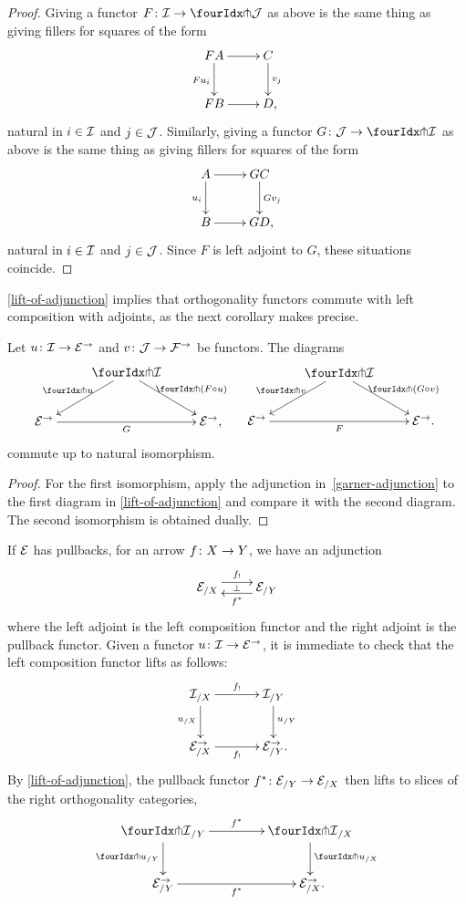\documentclass[reqno,10pt,a4paper,oneside,draft]{amsart}
\begin{document}
\begin{proof}
Giving a functor $F \co \cal{I} \to \liftl{\cal{J}}$ as above is the same thing as giving fillers for squares of the form
\[
\xymatrix{
  F A
  \ar[d]_{F u_i}
  \ar[r]
&
  C \ar[d]^{v_j}
\\
  F B
  \ar[r]
&
  D
\rlap{,}}
\]
natural in $i \in \cal{I}$ and $j \in \cal{J}$.
Similarly, giving a functor $G \co \cal{J} \to \liftl{\cal{I}}$ as above is the same thing as giving fillers for squares of the form
\[
\xymatrix{
  A
  \ar[d]_{u_i}
  \ar[r]
&
  G C
  \ar[d]^{G v_j}
\\
  B
  \ar[r]
&
  G D
\rlap{,}}
\]
natural in $i \in \cal{I}$ and $j \in \cal{J}$.
Since $F$ is left adjoint to $G$, these situations coincide.
\end{proof}

\cref{lift-of-adjunction} implies that orthogonality functors commute with left composition with adjoints, as the next corollary makes precise.

\begin{corollary} \label{pitchfork-adjunction}
Let $u \co \cal{I} \to \catE^\to$ and $v \co \cal{J} \to \cal{F}^\to$ be functors.
The diagrams
\begin{align*}
\xycenter{
&
  \liftr{\cal{I}}
  \ar[dr]^-{\liftr{(F \cc u)}}
  \ar[dl]_-{\liftr{u}}
&\\
  \catE^\to
  \ar[rr]_-{G}
&&
  \catE^\to
\rlap{,}}
&&
\xycenter{
&
  \liftl{\cal{I}}
  \ar[dl]_-{\liftl{v}}
  \ar[dr]^-{\liftl{(G \cc v)}}
&\\
  \catE^\to
  \ar[rr]_-{F}
&&
  \catE^\to
\rlap{.}}
\end{align*}
commute up to natural isomorphism.
\end{corollary}

\begin{proof}
For the first isomorphism, apply the adjunction in~\eqref{garner-adjunction} to the first diagram in \cref{lift-of-adjunction} and compare it with the second diagram.
The second isomorphism is obtained dually.
\end{proof}

\begin{example} \label{exa:composition-pullback-lift}
If $\cal{E}$ has pullbacks, for an arrow $f \co X \to Y$, we have an adjunction
\[
\xymatrix{
  \catE_{/X}
  \ar@<1ex>[r]^{f_!}
  \ar@{}[r]|{\bot}
&
  \catE_{/Y}
  \ar@<1ex>[l]^{f^*}
}
\]
where the left adjoint is the left composition functor and the right adjoint is the pullback functor.
Given a functor $u \co \cal{I} \to \catE^\to$, it is immediate to check that the left composition functor lifts as follows:
\[
\xymatrix@C+1em{
  \cal{I}_{/X}
  \ar[r]^-{f_!}
  \ar[d]_{u_{/X}}
&
  \cal{I}_{/Y}
  \ar[d]^{u_{/Y}}
\\
  \calE_{/X}^\to
  \ar[r]_-{f_!}
&
  \calE_{/Y}^\to
\rlap{.}}
\]
By \cref{lift-of-adjunction}, the pullback functor $f^* \co \catE_{/Y} \to \catE_{/X}$ then lifts to slices of the right orthogonality categories,
\[
\xymatrix@C=1.5cm{
  \liftr{\cal{I}}_{/Y}
  \ar[d]_{{\liftr{u}}_{/Y}}
  \ar[r]^{f^*}
&
  \liftr{\cal{I}}_{/X}
  \ar[d]^{{\liftr{u}}_{/X}}
\\
  {\catE}_{/Y}^\to
  \ar[r]_{f^*}
&
  \catE_{/X}^\to
\rlap{.}}
\]
\end{example}
\end{document}

